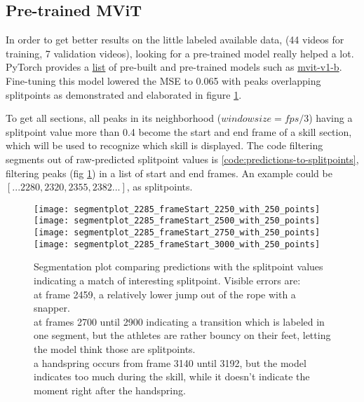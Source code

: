 \subsection{Pre-trained MViT}
\label{results:action-segmentation-mvit}

In order to get better results on the little labeled available data, (44 videos for training, 7 validation videos), looking for a pre-trained model really helped a lot.
PyTorch provides a \href{https://pytorch.org/vision/main/models.html}{list} of pre-built and pre-trained models such as \href{https://pytorch.org/vision/main/models/video_mvit.html}{mvit-v1-b}.
Fine-tuning this model lowered the MSE to 0.065 with peaks overlapping splitpoints as demonstrated and elaborated in figure \ref{fig:segmentation-plot}.

To get all sections, all peaks in its neighborhood (\(windowsize = fps / 3\)) having a splitpoint value more than 0.4 become the start and end frame of a skill section, which will be used to recognize which skill is displayed. The code filtering segments out of raw-predicted splitpoint values is \ref{code:predictions-to-splitpoints}, filtering peaks (fig  \ref{fig:segmentation-plot}) in a list of start and end frames. An example could be \([...2280, 2320, 2355, 2382...]\), as splitpoints.


\begin{figure}
    \centering
    \texttt{[image: segmentplot\_2285\_frameStart\_2250\_with\_250\_points]}
    \texttt{[image: segmentplot\_2285\_frameStart\_2500\_with\_250\_points]}
    \texttt{[image: segmentplot\_2285\_frameStart\_2750\_with\_250\_points]}
    \texttt{[image: segmentplot\_2285\_frameStart\_3000\_with\_250\_points]}
    \caption[Segmentation plot]{Segmentation plot comparing predictions with the splitpoint values indicating a match of interesting splitpoint. Visible errors are: \\
        at frame 2459, a relatively lower jump out of the rope with a snapper. \\
        at frames 2700 until 2900 indicating a transition which is labeled in one segment, but the athletes are rather bouncy on their feet, letting the model think those are splitpoints. \\
        a handspring occurs from frame 3140 until 3192, but the model indicates too much during the skill, while it doesn't indicate the moment right after the handspring.
    }
    \label{fig:segmentation-plot}
\end{figure}


